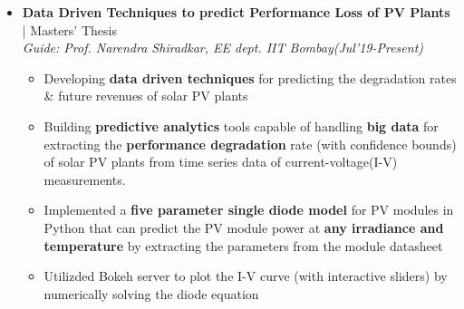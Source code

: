 \documentclass[a4paper, 10pt]{article}
\newcommand{\isep}{-2 pt}
\begin{document}
\begin{itemize} \itemsep \isep 
\vspace{-0.0cm}

\item \textbf{\large Data Driven Techniques to predict Performance Loss of PV Plants} | Masters' Thesis\\
 \textit{Guide: Prof. Narendra Shiradkar, EE dept. IIT Bombay}\hfill{\em{(Jul'19-Present)}}\\
	\begin{itemize}\itemsep \isep
	\vspace{-0.7cm}
		\item Developing \textbf{data driven techniques} for predicting the degradation rates \& future revenues of solar PV plants
\item Building \textbf{predictive analytics} tools capable of handling \textbf{big data} for extracting the \textbf{performance degradation} rate (with confidence bounds) of solar PV plants from time series data of current-voltage(I-V) measurements.
		\item  Implemented a \textbf{five parameter single diode model} for PV modules in Python that can predict the PV module power at \textbf{any irradiance and temperature} by extracting the parameters from the module datasheet
	\item Utilizded Bokeh server to plot the I-V curve (with interactive sliders) by numerically solving the diode equation
    \end{itemize}


\end{itemize}
\end{document}
